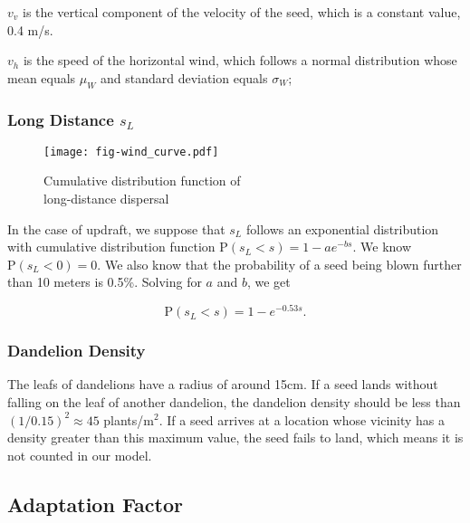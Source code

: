 \documentclass[12pt]{article}
\begin{document}
		$v_v$ is the vertical component of the velocity of the seed, which is a constant value, 0.4 m/s\autocite{tackenberg2003dandelion}.
		
		$v_h$ is the speed of the horizontal wind, which follows a normal distribution whose mean equals $\mu_W$ and standard deviation equals $\sigma_W$;

		\subsubsection{Long Distance $s_L$}
	
		\begin{wrapfigure}{r}{0.5\textwidth}
			\vspace{-1.5cm}
			\centering
			\texttt{[image: fig-wind\_curve.pdf]}
			\caption{Cumulative distribution function of\\long-distance dispersal}
			\label{fig:longDistance}
		\end{wrapfigure}
		
		In the case of updraft, we suppose that $s_L$ follows an exponential distribution\autocite{okubo1989theoretical} with cumulative distribution function $\mathrm{P} (s_L < s) = 1 - ae^{-bs}$.  We know $\mathrm{P} (s_L < 0) = 0$.  We also know that the probability of a seed being blown further than 10 meters is 0.5\%\autocite{tackenberg2003dandelion}.  Solving for $a$ and $b$, we get
		
		\begin{equation}\label{eq:updraft}
			\mathrm{P} (s_L < s) = 1 - e^{-0.53 s}.
		\end{equation}
		
		\newpage
		\subsubsection{Dandelion Density}
		
		The leafs of dandelions have a radius of around 15cm.  If a seed lands without falling on the leaf of another dandelion, the dandelion density should be less than $(1/0.15)^2 \approx 45$ plants/m$^2$.  If a seed arrives at a location whose vicinity has a density greater than this maximum value, the seed fails to land, which means it is not counted in our model.
		
		
		
		
		
	\subsection{Adaptation Factor}
	\label{sec:af}
		
\end{document}
